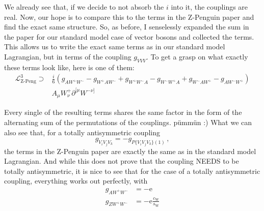 We already see that, if we decide to not absorb the $i$ into it, the couplings are real.
Now, our hope is to compare this to the terms in the Z-Penguin paper and find the exact same structure.
So, as before, I senselessly expanded the sum in the paper for our standard model case of vector bosons and collected the terms.
This allows us to write the exact same terms as in our standard model Lagrangian, but in terms of the coupling $g_{VVV}$.
To get a grasp on what exactly these terms look like, here is one of them:
\begin{align*}
    \mathcal{L}^3_\text{Z-Peng} \supset &\frac{i}{6} \left(g_{A W^+ W^-} - g_{W^+ A W^-} + g_{W^+ W^- A} - g_{W^- W^+ A} + g_{W^- A W^+} - g_{A W^- W^+} \right) \\
                                        &A_\mu W_\nu^+ \partial^{[ \mu} W^{- \nu ]}
\end{align*}

Every single of the resulting terms shares the same factor in the form of the alternating sum of the permutations of the couplings. pümmün :)
What we can also see that, for a totally antisymmetric coupling
\begin{equation}
    g_{V_i V_j V_k} = - g_{P \{V_i V_j V_k \}(1)} \,,
\end{equation} 
the terms in the Z-Penguin paper are exactly the same as in the standard model Lagrangian.
And while this does not prove that the coupling NEEDS to be totally antisymmetric, it is nice to see that for the case of a totally antisymmetric coupling, everything works out perfectly,
with
\begin{align}
    g_{A W^+ W^-} &= - \text{e} \\
    g_{Z W^+ W^-} &= - \text{e} \frac{c_\text{W}}{s_\text{W}}
\end{align}